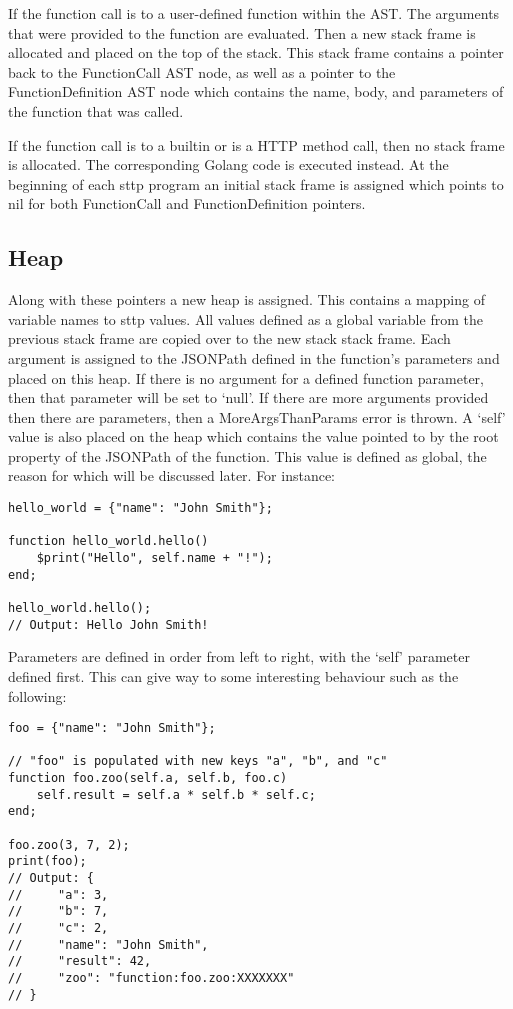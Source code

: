 If the function call is to a user-defined function within the AST. The arguments that were provided to the function are evaluated. Then a new stack frame is allocated and placed on the top of the stack. This stack frame contains a pointer back to the FunctionCall AST node, as well as a pointer to the FunctionDefinition AST node which contains the name, body, and parameters of the function that was called.

If the function call is to a builtin or is a HTTP method call, then no stack frame is allocated. The corresponding Golang code is executed instead. At the beginning of each sttp program an initial stack frame is assigned which points to nil for both FunctionCall and FunctionDefinition pointers.

\subsection{Heap}
\label{sec:function-heap}

Along with these pointers a new heap is assigned. This contains a mapping of variable names to sttp values. All values defined as a global variable from the previous stack frame are copied over to the new stack stack frame. Each argument is assigned to the JSONPath defined in the function's parameters and placed on this heap. If there is no argument for a defined function parameter, then that parameter will be set to `null'. If there are more arguments provided then there are parameters, then a MoreArgsThanParams error is thrown. A `self' value is also placed on the heap which contains the value pointed to by the root property of the JSONPath of the function. This value is defined as global, the reason for which will be discussed later. For instance:

\begin{verbatim}
hello_world = {"name": "John Smith"};

function hello_world.hello()
    $print("Hello", self.name + "!");
end;

hello_world.hello();
// Output: Hello John Smith!
\end{verbatim}

Parameters are defined in order from left to right, with the `self' parameter defined first. This can give way to some interesting behaviour such as the following:

\begin{verbatim}
foo = {"name": "John Smith"};

// "foo" is populated with new keys "a", "b", and "c"
function foo.zoo(self.a, self.b, foo.c)
    self.result = self.a * self.b * self.c;
end;

foo.zoo(3, 7, 2);
print(foo);
// Output: {
//     "a": 3,
//     "b": 7,
//     "c": 2,
//     "name": "John Smith",
//     "result": 42,
//     "zoo": "function:foo.zoo:XXXXXXX"
// }
\end{verbatim}

